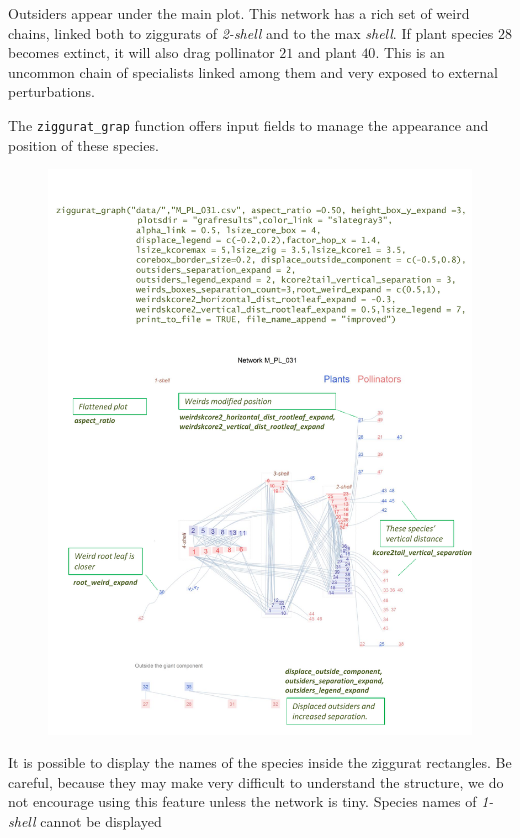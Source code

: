 \documentclass[11pt]{article}
\begin{document}
Outsiders appear under the main plot. This network has a rich set of weird chains, linked both to ziggurats of \textit{2-shell} and to the
max \textit{shell}. If plant species $28$ becomes extinct, it will also drag pollinator $21$ and plant $40$. This is an uncommon chain of
specialists linked among them and very exposed to external perturbations.

The \texttt{ziggurat\_grap} function offers input fields to manage the appearance and position of these species.

\clearpage
\begin{figure}[hp!]
\centering
\includegraphics[scale=0.8]{M_PL_031_ziggurat_improved.pdf}
\label{fig:KMAN_ziggurat_031_improved}
\end{figure}


\clearpage

It is possible to display the names of the species inside the ziggurat rectangles. Be careful, because they may make
very difficult to understand the structure, we do not encourage using this feature unless the network is tiny. Species
names of \textit{1-shell} cannot be displayed
\end{document}
